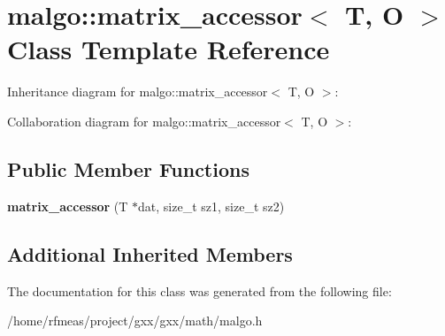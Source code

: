 \hypertarget{classmalgo_1_1matrix__accessor}{}\section{malgo\+:\+:matrix\+\_\+accessor$<$ T, O $>$ Class Template Reference}
\label{classmalgo_1_1matrix__accessor}


Inheritance diagram for malgo\+:\+:matrix\+\_\+accessor$<$ T, O $>$\+:


Collaboration diagram for malgo\+:\+:matrix\+\_\+accessor$<$ T, O $>$\+:
\subsection*{Public Member Functions}
\begin{DoxyCompactItemize}
\item 
{\bfseries matrix\+\_\+accessor} (T $\ast$dat, size\+\_\+t sz1, size\+\_\+t sz2)\hypertarget{classmalgo_1_1matrix__accessor_a4b742cff83500e49af5f7fc84603277f}{}\label{classmalgo_1_1matrix__accessor_a4b742cff83500e49af5f7fc84603277f}

\end{DoxyCompactItemize}
\subsection*{Additional Inherited Members}


The documentation for this class was generated from the following file\+:\begin{DoxyCompactItemize}
\item 
/home/rfmeas/project/gxx/gxx/math/malgo.\+h\end{DoxyCompactItemize}
